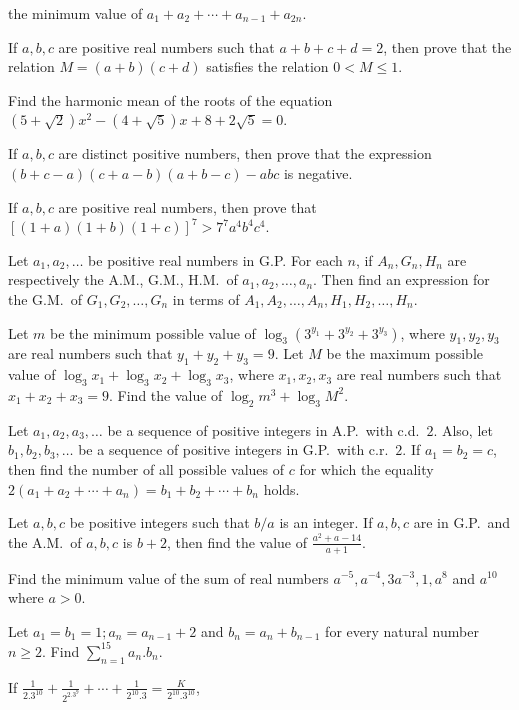   the minimum value of $a_1 + a_2 + \cdots + a_{n - 1} + a_{2n}$.
\item If $a, b, c$ are positive real numbers such that $a + b + c + d = 2$, then prove that the relation $M
  = (a + b)(c + d)$ satisfies the relation $0 < M \leq 1$.
\item Find the harmonic mean of the roots of the equation $\left(5 + \sqrt{2}\right)x^2 - \left(4 +
  \sqrt{5}\right)x + 8 + 2\sqrt{5} = 0$.
\item If $a, b, c$ are distinct positive numbers, then prove that the expression $(b + c - a)(c + a - b)(a +
  b - c) - abc$ is negative.
\item If $a, b, c$ are positive real numbers, then prove that $\left[(1 + a)(1 + b)(1 + c)\right]^7 >
  7^7a^4b^4c^4$.
\item Let $a_1, a_2, \ldots$ be positive real numbers in G.P. For each $n$, if $A_n, G_n, H_n$ are
  respectively the A.M., G.M., H.M.\ of $a_1, a_2, \ldots, a_n$. Then find an expression for the G.M.\ of
  $G_1, G_2, \ldots, G_n$ in terms of $A_1, A_2, \ldots, A_n, H_1, H_2, \ldots, H_n$.
\item Let $m$ be the minimum possible value of $\log_3\left(3^{y_1} + 3^{y_2} + 3^{y_3}\right)$, where $y_1,
  y_2, y_3$ are real numbers such that $y_1 + y_2 + y_3 = 9$. Let $M$ be the maximum possible value of
  $\log_3x_1 + \log_3x_2 + \log_3x_3$, where $x_1, x_2, x_3$ are real numbers such that $x_1 + x_2 + x_3 =
  9$. Find the value of $\log_2m^3 + \log_3M^2$.
\item Let $a_1, a_2, a_3, \ldots$ be a sequence of positive integers in A.P.\ with c.d.\ $2$. Also, let
  $b_1, b_2, b_3, \ldots$ be a sequence of positive integers in G.P.\ with c.r.\ $2$. If $a_1 = b_2 = c$,
  then find the number of all possible values of $c$ for which the equality $2(a_1 + a_2 + \cdots + a_n) =
  b_1 + b_2 + \cdots + b_n$ holds.
\item Let $a, b, c$ be positive integers such that $b/a$ is an integer. If $a, b, c$ are in G.P.\ and the
  A.M.\ of $a, b, c$ is $b + 2$, then find the value of $\frac{a^2 + a - 14}{a + 1}$.
\item Find the minimum value of the sum of real numbers $a^{-5}, a^{-4}, 3a^{-3}, 1, a^8$ and $a^{10}$ where
  $a > 0$.
\item Let $a_1 = b_1 = 1; a_n = a_{n - 1} + 2$ and $b_n = a_n + b_{n - 1}$ for every natural number $n\geq
  2$. Find $\displaystyle\sum_{n = 1}^{15}a_n.b_n$.
\item If $\frac{1}{2.3^{10}} + \frac{1}{2^2.3^9} + \cdots + \frac{1}{2^{10}.3} = \frac{K}{2^{10}.3^{10}}$,
